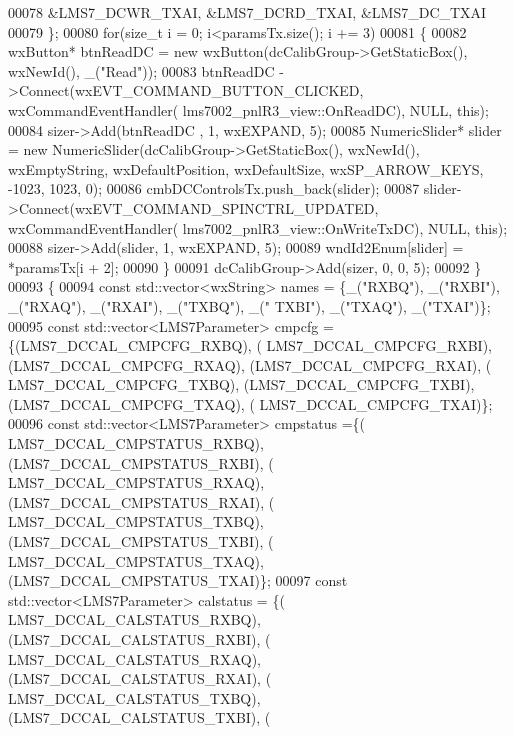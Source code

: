 \begin{DoxyCode}
00078                 &LMS7_DCWR_TXAI, &LMS7_DCRD_TXAI, &LMS7_DC_TXAI
00079             \};
00080             \textcolor{keywordflow}{for}(\textcolor{keywordtype}{size\_t} i = 0; i<paramsTx.size(); i += 3)
00081             \{
00082                 wxButton* btnReadDC = \textcolor{keyword}{new} wxButton(dcCalibGroup->GetStaticBox(), wxNewId(), \_(\textcolor{stringliteral}{"Read"}));
00083                 btnReadDC ->Connect(wxEVT\_COMMAND\_BUTTON\_CLICKED, wxCommandEventHandler(
      lms7002_pnlR3_view::OnReadDC), NULL, \textcolor{keyword}{this});
00084                 sizer->Add(btnReadDC , 1, wxEXPAND, 5);
00085                 NumericSlider* slider = \textcolor{keyword}{new} NumericSlider(dcCalibGroup->GetStaticBox(), wxNewId(), 
      wxEmptyString, wxDefaultPosition, wxDefaultSize, wxSP\_ARROW\_KEYS, -1023, 1023, 0);
00086                 cmbDCControlsTx.push\_back(slider);
00087                 slider->Connect(wxEVT\_COMMAND\_SPINCTRL\_UPDATED, wxCommandEventHandler(
      lms7002_pnlR3_view::OnWriteTxDC), NULL, \textcolor{keyword}{this});
00088                 sizer->Add(slider, 1, wxEXPAND, 5);
00089                 wndId2Enum[slider] = *paramsTx[i + 2];
00090             \}
00091             dcCalibGroup->Add(sizer, 0, 0, 5);
00092         \}
00093         \{
00094             \textcolor{keyword}{const} std::vector<wxString> names = \{\_(\textcolor{stringliteral}{"RXBQ"}), \_(\textcolor{stringliteral}{"RXBI"}), \_(\textcolor{stringliteral}{"RXAQ"}), \_(\textcolor{stringliteral}{"RXAI"}), \_(\textcolor{stringliteral}{"TXBQ"}), \_(\textcolor{stringliteral}{"
      TXBI"}), \_(\textcolor{stringliteral}{"TXAQ"}), \_(\textcolor{stringliteral}{"TXAI"})\};
00095             \textcolor{keyword}{const} std::vector<LMS7Parameter> cmpcfg = \{(LMS7_DCCAL_CMPCFG_RXBQ), (
      LMS7_DCCAL_CMPCFG_RXBI), (LMS7_DCCAL_CMPCFG_RXAQ), (LMS7_DCCAL_CMPCFG_RXAI), (
      LMS7_DCCAL_CMPCFG_TXBQ), (LMS7_DCCAL_CMPCFG_TXBI), (LMS7_DCCAL_CMPCFG_TXAQ), (
      LMS7_DCCAL_CMPCFG_TXAI)\};
00096             \textcolor{keyword}{const} std::vector<LMS7Parameter> cmpstatus =\{(
      LMS7_DCCAL_CMPSTATUS_RXBQ), (LMS7_DCCAL_CMPSTATUS_RXBI), (
      LMS7_DCCAL_CMPSTATUS_RXAQ), (LMS7_DCCAL_CMPSTATUS_RXAI), (
      LMS7_DCCAL_CMPSTATUS_TXBQ), (LMS7_DCCAL_CMPSTATUS_TXBI), (
      LMS7_DCCAL_CMPSTATUS_TXAQ), (LMS7_DCCAL_CMPSTATUS_TXAI)\};
00097             \textcolor{keyword}{const} std::vector<LMS7Parameter> calstatus = \{(
      LMS7_DCCAL_CALSTATUS_RXBQ), (LMS7_DCCAL_CALSTATUS_RXBI), (
      LMS7_DCCAL_CALSTATUS_RXAQ), (LMS7_DCCAL_CALSTATUS_RXAI), (
      LMS7_DCCAL_CALSTATUS_TXBQ), (LMS7_DCCAL_CALSTATUS_TXBI), (

\end{DoxyCode}
